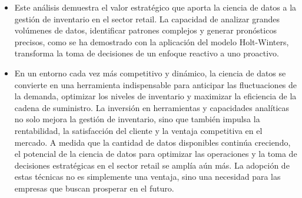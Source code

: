 \documentclass[
]{book}
\begin{document}
\begin{itemize}
\item
  Este análisis demuestra el valor estratégico que aporta la ciencia de datos a la gestión de inventario en el sector retail. La capacidad de analizar grandes volúmenes de datos, identificar patrones complejos y generar pronósticos precisos, como se ha demostrado con la aplicación del modelo Holt-Winters, transforma la toma de decisiones de un enfoque reactivo a uno proactivo.
\item
  En un entorno cada vez más competitivo y dinámico, la ciencia de datos se convierte en una herramienta indispensable para anticipar las fluctuaciones de la demanda, optimizar los niveles de inventario y maximizar la eficiencia de la cadena de suministro. La inversión en herramientas y capacidades analíticas no solo mejora la gestión de inventario, sino que también impulsa la rentabilidad, la satisfacción del cliente y la ventaja competitiva en el mercado. A medida que la cantidad de datos disponibles continúa creciendo, el potencial de la ciencia de datos para optimizar las operaciones y la toma de decisiones estratégicas en el sector retail se amplía aún más. La adopción de estas técnicas no es simplemente una ventaja, sino una necesidad para las empresas que buscan prosperar en el futuro.
\end{itemize}

  
\end{document}
